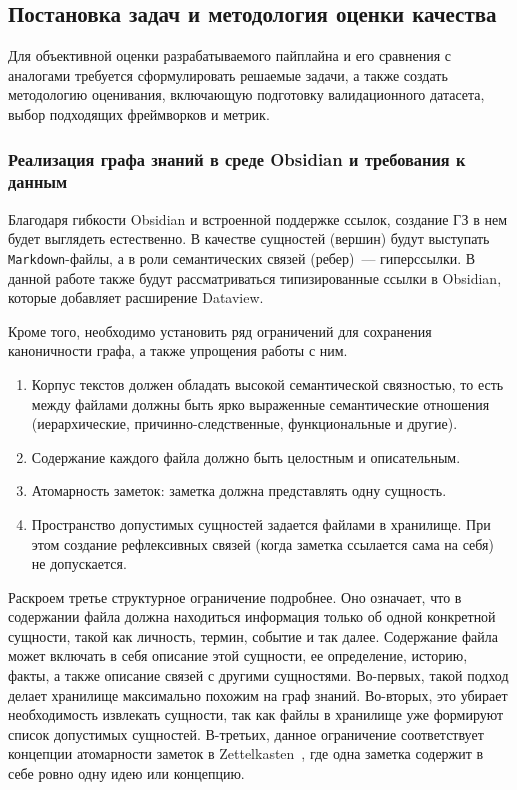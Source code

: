 \subsection{Постановка задач и методология оценки качества}

Для объективной оценки разрабатываемого пайплайна и его сравнения с аналогами
требуется сформулировать решаемые задачи,
а также создать методологию оценивания,
включающую подготовку валидационного датасета,
выбор подходящих фреймворков и метрик.

\subsubsection*{Реализация графа знаний в среде Obsidian и требования к данным}

Благодаря гибкости Obsidian и встроенной поддержке ссылок,
создание ГЗ в нем будет выглядеть естественно.
В качестве сущностей (вершин) будут выступать \texttt{Markdown}-файлы,
а в роли семантических связей (ребер)~--- гиперссылки.
В данной работе также будут рассматриваться типизированные ссылки в Obsidian,
которые добавляет расширение Dataview.

Кроме того, необходимо установить ряд ограничений для сохранения каноничности графа,
а также упрощения работы с ним.
\begin{enumerate}
      \item Корпус текстов должен обладать высокой семантической связностью,
            то есть между файлами должны быть ярко выраженные семантические отношения
            (иерархические, причинно-следственные, функциональные и другие).
      \item Содержание каждого файла должно быть целостным и описательным.
      \item Атомарность заметок: заметка должна представлять одну сущность.
      \item Пространство допустимых сущностей задается файлами в хранилище.
            При этом создание рефлексивных связей
            (когда заметка ссылается сама на себя) не допускается.
\end{enumerate}

Раскроем третье структурное ограничение подробнее.
Оно означает, что в содержании файла должна находиться информация только
об одной конкретной сущности, такой как личность, термин, событие и так далее.
Содержание файла может включать в себя описание этой сущности, ее определение, историю,
факты, а также описание связей с другими сущностями.
Во-первых, такой подход делает хранилище максимально похожим на граф знаний.
Во-вторых, это убирает необходимость извлекать сущности,
так как файлы в хранилище уже формируют список допустимых сущностей.
В-третьих, данное ограничение соответствует концепции
атомарности заметок в Zettelkasten~\cite{Ahrens_2017},
где одна заметка содержит в себе ровно одну идею или концепцию.

